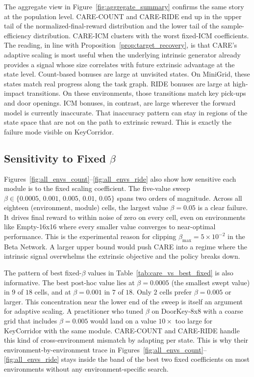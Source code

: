 The aggregate view in Figure~\ref{fig:aggregate_summary} confirms the same story at the population level. CARE-COUNT and CARE-RIDE end up in the upper tail of the normalized-final-reward distribution and the lower tail of the sample-efficiency distribution. CARE-ICM clusters with the worst fixed-ICM coefficients. The reading, in line with Proposition~\ref{prop:target_recovery}, is that CARE's adaptive scaling is most useful when the underlying intrinsic generator already provides a signal whose size correlates with future extrinsic advantage at the state level. Count-based bonuses are large at unvisited states. On MiniGrid, these states match real progress along the task graph. RIDE bonuses are large at high-impact transitions. On these environments, those transitions match key pick-ups and door openings. ICM bonuses, in contrast, are large wherever the forward model is currently inaccurate. That inaccuracy pattern can stay in regions of the state space that are not on the path to extrinsic reward. This is exactly the failure mode visible on KeyCorridor.

\subsection{Sensitivity to Fixed \texorpdfstring{$\beta$}{beta}}
\label{sec:results_sensitivity}

Figures~\ref{fig:all_envs_count}--\ref{fig:all_envs_ride} also show how sensitive each module is to the fixed scaling coefficient. The five-value sweep $\beta \in \{0.0005,\,0.001,\,0.005,\,0.01,\,0.05\}$ spans two orders of magnitude. Across all eighteen (environment, module) cells, the largest value $\beta = 0.05$ is a clear failure. It drives final reward to within noise of zero on every cell, even on environments like Empty-16x16 where every smaller value converges to near-optimal performance. This is the experimental reason for clipping $\beta_\text{max} = 5 \times 10^{-2}$ in the Beta Network. A larger upper bound would push CARE into a regime where the intrinsic signal overwhelms the extrinsic objective and the policy breaks down.

The pattern of best fixed-$\beta$ values in Table~\ref{tab:care_vs_best_fixed} is also informative. The best post-hoc value lies at $\beta = 0.0005$ (the smallest swept value) in $9$ of $18$ cells, and at $\beta = 0.001$ in $7$ of $18$. Only $2$ cells prefer $\beta = 0.005$ or larger. This concentration near the lower end of the sweep is itself an argument for adaptive scaling. A practitioner who tuned $\beta$ on DoorKey-8x8 with a coarse grid that includes $\beta = 0.005$ would land on a value $10\times$ too large for KeyCorridor with the same module. CARE-COUNT and CARE-RIDE handle this kind of cross-environment mismatch by adapting per state. This is why their environment-by-environment trace in Figures~\ref{fig:all_envs_count}--\ref{fig:all_envs_ride} stays inside the band of the best two fixed coefficients on most environments without any environment-specific search.

